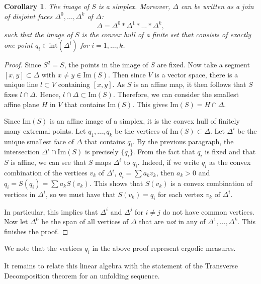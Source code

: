 \documentclass[11pt, letterpaper]{amsart}
\theoremstyle{plain}
\newtheorem{corollary}[theorem]{Corollary}
\theoremstyle{definition}
\begin{document}
\begin{corollary}\label{cor:simplex_decomposition}
  The image of $S$ is a simplex. Moreover, $\Delta$ can be written as a join of
  disjoint faces $\Delta^0, \ldots, \Delta^k$ of $\Delta$:
  \[
    \Delta = \Delta^0 \ast \Delta^1 \ast \ldots \ast \Delta^k,
  \]
  such that the image of $S$ is the convex hull of a finite set that consists of
  exactly one point $q_i \in \mathrm{int}(\Delta^i)$ for $i=1,\ldots,k$.
\end{corollary}

\begin{proof}
  Since $S^2=S$, the points in the image of $S$ are fixed. Now take a segment
  $[x,y]\subset \Delta$ with $x \neq y \in \textrm{Im}(S)$. Then since $V$
  is a vector space, there is a unique line $l\subset V$
  containing $[x,y]$. As $S$ is an affine map, it then follows that $S$ fixes $l
  \cap \Delta$. Hence, $l \cap \Delta \subset \textrm{Im}(S)$. 
  Therefore, we can
  consider the smallest affine plane $H$ in $V$ that contains $\textrm{Im}(S)$.
  This gives $\textrm{Im}(S)=H \cap \Delta$.

  Since $\textrm{Im}(S)$ is an affine image of a simplex, it is the convex hull of finitely many extremal points. 
  Let $q_1,\ldots,q_k$ be the vertices of
    $\textrm{Im}(S) \subset \Delta$. Let $\Delta^i$ be the unique
  smallest face of $\Delta$ that contains $q_i$. By the previous
  paragraph, the intersection $\Delta^i\cap \textrm{Im}(S)$ is precisely $\{q_i\}$.
  From the fact that $q_i$ is fixed and that $S$ is affine, we can see that $S$ maps
  $\Delta^i$ to $q_i$. Indeed, if we write $q_i$ as the
  convex combination of the vertices $v_k$ of $\Delta^i$, $q_i=\sum a_kv_k$, then $a_k>0$ and
  $q_i=S(q_i)=\sum a_k S(v_k)$. This shows that $S(v_k)$ is a convex
  combination of vertices in $\Delta^i$, so we must have that $S(v_k)=q_i$ for each vertex $v_k$ of $\Delta^i$. 

  In particular, this implies that $\Delta^i$ and $\Delta^j$ for $i \neq j$ do not have
    common vertices. Now let $\Delta^0$ be the span of all vertices of $\Delta$ that are
    \emph{not} in any of $\Delta^1,\ldots,\Delta^k$. This finishes the
    proof.
    \end{proof}  
    We note that the vertices $q_i$ in the above proof represent ergodic measures.

It remains to relate this linear algebra with the statement of the Transverse
Decomposition theorem for an unfolding sequence.
\end{document}
